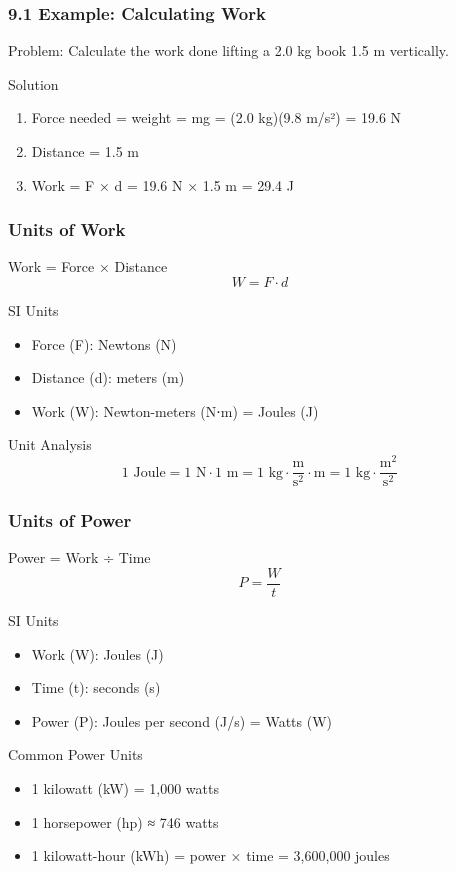 \documentclass{beamer}
\begin{document}
\begin{frame}
\frametitle{9.1 Example: Calculating Work}
Problem: Calculate the work done lifting a 2.0 kg book 1.5 m vertically.
\begin{block}{Solution}
\begin{enumerate}
\item Force needed = weight = mg = (2.0 kg)(9.8 m/s²) = 19.6 N
\item Distance = 1.5 m
\item Work = F × d = 19.6 N × 1.5 m = 29.4 J
\end{enumerate}
\end{block}
\end{frame}
\begin{frame}
\frametitle{Units of Work}
\begin{block}{Work = Force × Distance}
$$W = F \cdot d$$
\end{block}

\begin{block}{SI Units}
\begin{itemize}
\item Force (F): Newtons (N)
\item Distance (d): meters (m)
\item Work (W): Newton-meters (N⋅m) = Joules (J)
\end{itemize}
\end{block}

\begin{block}{Unit Analysis}
$$1 \text{ Joule} = 1 \text{ N} \cdot 1 \text{ m} = 1 \text{ kg}\cdot\frac{\text{m}}{\text{s}^2} \cdot \text{m} = 1 \text{ kg}\cdot\frac{\text{m}^2}{\text{s}^2}$$
\end{block}
\end{frame}

\begin{frame}
\frametitle{Units of Power}
\begin{block}{Power = Work ÷ Time}
$$P = \frac{W}{t}$$
\end{block}

\begin{block}{SI Units}
\begin{itemize}
\item Work (W): Joules (J)
\item Time (t): seconds (s)
\item Power (P): Joules per second (J/s) = Watts (W)
\end{itemize}
\end{block}

\begin{block}{Common Power Units}
\begin{itemize}
\item 1 kilowatt (kW) = 1,000 watts
\item 1 horsepower (hp) ≈ 746 watts
\item 1 kilowatt-hour (kWh) = power × time = 3,600,000 joules
\end{itemize}
\end{block}
\end{frame}
\end{document}
